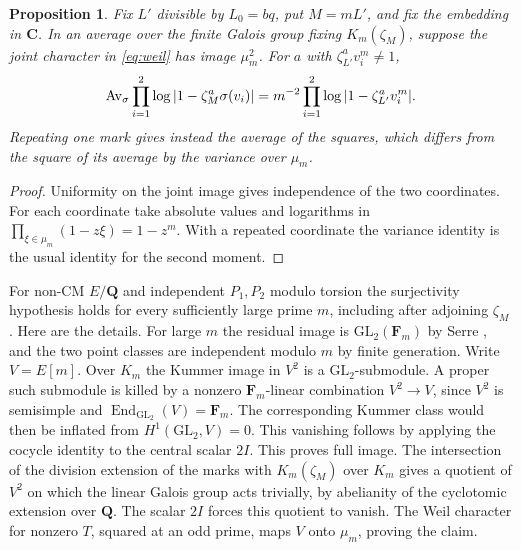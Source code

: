 \documentclass[11pt]{article}
\newtheorem{proposition}[theorem]{Proposition}
\newcommand{\Q}{\mathbf Q}\newcommand{\R}{\mathbf R}\newcommand{\Z}{\mathbf Z}
\newcommand{\C}{\mathbf C}\newcommand{\eps}{\varepsilon}\newcommand{\dd}{\mathrm d}
\begin{document}
\begin{proposition}\label{prop:trace}
Fix \(L'\) divisible by \(L_0=bq\), put \(M=mL'\), and fix the embedding
in \(\C\). In an average over the finite Galois group fixing
\(K_m(\zeta_M)\), suppose the joint character in \eqref{eq:weil} has image
\(\mu_m^2\). For \(a\) with \(\zeta_{L'}^a v_i^m\ne1\),
\begin{equation}\label{eq:trace}
 \operatorname{Av}_\sigma\prod_{i=1}^2\log|1-\zeta_M^a\sigma(v_i)|
 =m^{-2}\prod_{i=1}^2\log|1-\zeta_{L'}^a v_i^m|.
\end{equation}
Repeating one mark gives instead the average of the squares, which differs
from the square of its average by the variance over \(\mu_m\).
\end{proposition}
\begin{proof}
Uniformity on the joint image gives independence of the two coordinates.
For each coordinate take absolute values and logarithms in
\(\prod_{\xi\in\mu_m}(1-z\xi)=1-z^m\). With a repeated coordinate
the variance identity is the usual identity for the second moment.
\end{proof}
For non-CM \(E/\Q\) and independent \(P_1,P_2\) modulo torsion the
surjectivity hypothesis holds for every sufficiently large prime \(m\),
including after adjoining \(\zeta_M\).
Here are the details. For large \(m\) the residual image is
\(\mathrm{GL}_2(\mathbf F_m)\) by Serre \cite{Serre}, and the two
point classes are independent modulo \(m\) by finite generation.
Write \(V=E[m]\). Over \(K_m\) the Kummer image in \(V^2\) is a
\(\mathrm{GL}_2\)-submodule. A proper such submodule is killed by a
nonzero \(\mathbf F_m\)-linear combination \(V^2\to V\), since \(V^2\)
is semisimple and \(\operatorname{End}_{\mathrm{GL}_2}(V)=\mathbf F_m\).
The corresponding Kummer class would then be inflated from
\(H^1(\mathrm{GL}_2,V)=0\). This vanishing follows by applying the
cocycle identity to the central scalar \(2I\). This proves full image.
The intersection of the division extension of the marks with
\(K_m(\zeta_M)\) over \(K_m\) gives a quotient of \(V^2\) on which
the linear Galois group acts trivially, by abelianity of the cyclotomic
extension over \(\Q\). The scalar \(2I\) forces this quotient to vanish.
The Weil character for nonzero \(T\), squared at an odd prime, maps
\(V\) onto \(\mu_m\), proving the claim.
\end{document}
